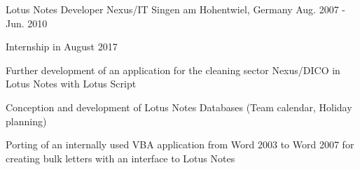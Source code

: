 \begin{cventries}
  \cventry
    {Lotus Notes Developer} %
    {Nexus/IT} %
    {Singen am Hohentwiel, Germany} %
    {Aug. 2007 - Jun. 2010} %
    {
      \begin{cvitems} %
        \item {Internship in August 2017}
        \item {Further development of an application for the cleaning sector Nexus/DICO in Lotus Notes with Lotus Script}
        \item {Conception and development of Lotus Notes Databases (Team calendar, Holiday planning)}
        \item {Porting of an internally used VBA application from Word 2003 to Word 2007 for creating bulk letters with an interface to Lotus Notes}
      \end{cvitems}
    }

\end{cventries}
